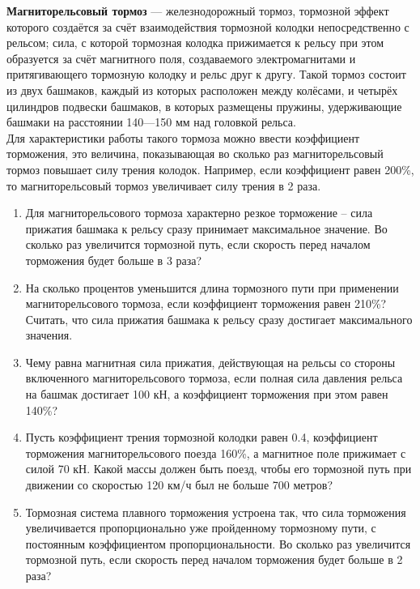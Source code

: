 \textbf{Магниторельсовый тормоз} — железнодорожный тормоз, тормозной эффект которого создаётся за счёт взаимодействия тормозной колодки непосредственно с рельсом; сила, с которой тормозная колодка прижимается к рельсу при этом образуется за счёт магнитного поля, создаваемого электромагнитами и притягивающего тормозную колодку и рельс друг к другу. Такой тормоз состоит из двух башмаков, каждый из которых расположен между колёсами, и четырёх цилиндров подвески башмаков, в которых размещены пружины, удерживающие башмаки на расстоянии 140—150 мм над головкой рельса.\\
Для характеристики работы такого тормоза можно ввести коэффициент торможения, это величина, показывающая во сколько раз магниторельсовый тормоз повышает силу трения колодок. Например, если коэффициент равен 200\%, то магниторельсовый тормоз увеличивает силу трения в 2 раза.
\begin{enumerate}
\item Для магниторельсового тормоза характерно резкое торможение – сила прижатия башмака к рельсу сразу принимает максимальное значение. Во сколько раз увеличится тормозной путь, если скорость перед началом торможения будет больше в 3 раза?
\item На сколько процентов уменьшится длина тормозного пути при применении магниторельсового тормоза, если коэффициент торможения равен 210\%? Считать, что сила прижатия башмака к рельсу сразу достигает максимального значения.
\item Чему равна магнитная сила прижатия, действующая на рельсы со стороны включенного магниторельсового тормоза, если полная сила давления рельса на башмак достигает 100 кН, а коэффициент торможения при этом равен 140\%?
\item Пусть коэффициент трения тормозной колодки равен 0.4, коэффициент торможения магниторельсового поезда 160\%, а магнитное поле прижимает с силой 70 кН. Какой массы должен быть поезд, чтобы его тормозной путь при движении со скоростью 120 км/ч был не больше 700 метров?
\item Тормозная система плавного торможения устроена так, что сила торможения увеличивается пропорционально уже пройденному тормозному пути, с постоянным коэффициентом пропорциональности. Во сколько раз увеличится тормозной путь, если скорость перед началом торможения будет больше в 2 раза?
\end{enumerate}